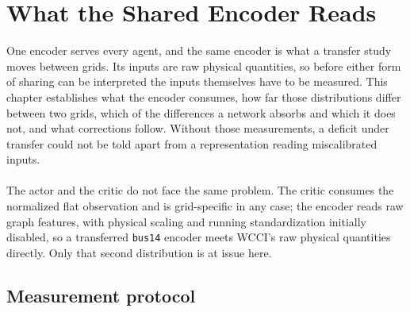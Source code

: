 \chapter{What the Shared Encoder Reads}
\label{ch:encoder-inputs}

One encoder serves every agent, and the same encoder is what a transfer study
moves between grids. Its inputs are raw physical quantities, so before either
form of sharing can be interpreted the inputs themselves have to be measured.
This chapter establishes what the encoder consumes, how far those distributions
differ between two grids, which of the differences a network absorbs and which
it does not, and what corrections follow. Without those measurements, a deficit
under transfer could not be told apart from a representation reading
miscalibrated inputs. 
\\
\\
The actor and the critic do not face the same problem. The critic consumes the
normalized flat observation and is grid-specific in any case; the encoder reads
raw graph features, with physical scaling and running standardization initially
disabled, so a transferred \texttt{bus14} encoder meets WCCI's raw physical
quantities directly. Only that second distribution is at issue here.


\section{Measurement protocol}
\label{sec:wcci-protocol}

